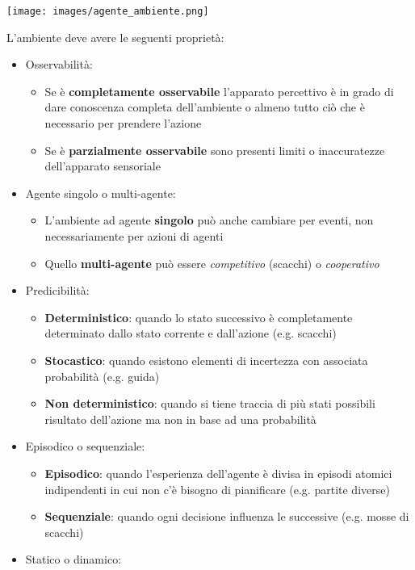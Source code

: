 \begin{center}
	\texttt{[image: images/agente\_ambiente.png]}
\end{center}

L'ambiente deve avere le seguenti proprietà:
\begin{itemize}
	\item Osservabilità:
	\begin{itemize}
		\item Se è \textbf{completamente osservabile} l'apparato percettivo è in grado di dare conoscenza completa dell'ambiente o almeno tutto ciò che è necessario per prendere l'azione
		\item Se è \textbf{parzialmente osservabile} sono presenti limiti o inaccuratezze dell'apparato sensoriale
	\end{itemize}
	\item Agente singolo o multi-agente:
	\begin{itemize}
		\item L'ambiente ad agente \textbf{singolo} può anche cambiare per eventi, non
		necessariamente per azioni di agenti
		\item Quello \textbf{multi-agente} può essere \emph{competitivo} (scacchi) o \emph{cooperativo}
	\end{itemize}
	\item Predicibilità:
	\begin{itemize}
		\item \textbf{Deterministico}: quando lo stato successivo è completamente determinato dallo stato corrente e dall’azione (e.g. scacchi)
		\item \textbf{Stocastico}: quando esistono elementi di incertezza con associata probabilità (e.g. guida)
		\item \textbf{Non deterministico}: quando si tiene traccia di più stati possibili risultato dell’azione ma non in base ad una probabilità
	\end{itemize}
	\item Episodico o sequenziale:
	\begin{itemize}
		\item \textbf{Episodico}: quando l’esperienza dell’agente è divisa in episodi atomici
		indipendenti in cui non c'è bisogno di pianificare (e.g. partite diverse)
		\item \textbf{Sequenziale}: quando ogni decisione influenza le successive (e.g. mosse di scacchi)
	\end{itemize}
	\item Statico o dinamico:

\end{itemize}
